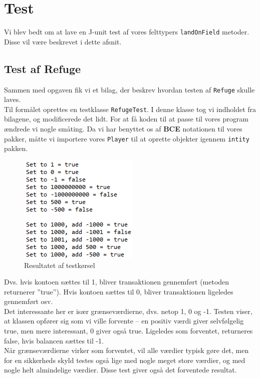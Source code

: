 \section{Test}
Vi blev bedt om at lave en J-unit test af vores felttypers \texttt{landOnField} metoder. Disse vil være beskrevet i dette afsnit.
\subsection{Test af Refuge}
Sammen med opgaven fik vi et bilag, der beskrev hvordan testen af \texttt{Refuge} skulle laves.
\\

Til formålet oprettes en testklasse \texttt{RefugeTest}. I denne klasse tog vi indholdet fra bilagene, og modificerede det lidt. For at få koden til at passe til vores program ændrede vi nogle småting. Da vi har benyttet os af \textbf{BCE} notationen til vores pakker, måtte vi importere vores \texttt{Player} til at oprette objekter igennem \texttt{intity} pakken.
\begin{figure}[!ht]
\centering
\includegraphics[scale=0.4]{test-illustrationer1.jpg}
\caption[<Text for the list of figures>]{Resultatet af testkørsel}
\label{fig:figure 2} 
\end{figure}
Dvs. hvis kontoen sættes til 1, bliver transaktionen gennemført (metoden returnerer ”true”). Hvis kontoen sættes til 0, bliver transaktionen ligeledes gennemført osv.
\\

Det interessante her er især grænseværdierne, dvs. netop 1, 0 og -1. Testen viser, at klassen opfører sig som vi ville forvente – en positiv værdi giver selvfølgelig true, men mere interessant, 0 giver også true. Ligeledes som forventet, returneres false, hvis balancen sættes til -1.
\\

Når grænseværdierne virker som forventet, vil alle værdier typisk gøre det, men for en sikkerheds skyld testes også lige med nogle meget store værdier, og med nogle helt almindelige værdier. Disse test giver også det forventede resultat.
\\

